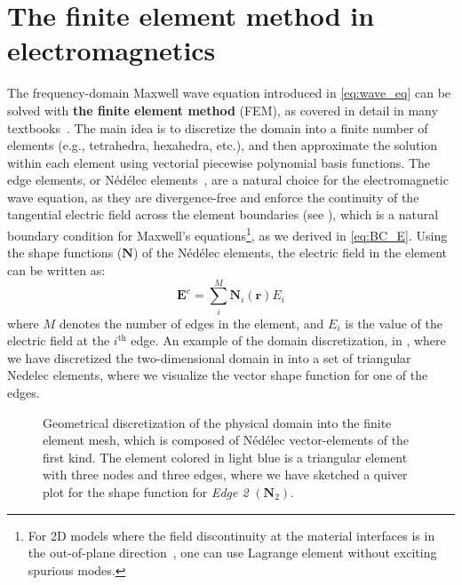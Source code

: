     \section{The finite element method in electromagnetics}\label{sec:fem}
    The frequency-domain Maxwell wave equation introduced in \eqref{eq:wave_eq} can be solved with \textbf{the finite element method} (FEM), as covered in detail 
    in many textbooks~\cite{jin, fem_book}. The main idea is to discretize the domain into a finite number of elements (e.g., tetrahedra, hexahedra, etc.), and then approximate the solution
    within each element using vectorial piecewise polynomial basis functions. The
    edge elements, or Nédélec elements~\cite{nedelec},
    are a natural choice for the electromagnetic
    wave equation, as they are divergence-free and enforce the continuity of the
    tangential electric field
    across the element boundaries (see ), which is a natural boundary condition for
    Maxwell's equations\footnote{For 2D models where the field discontinuity at the material
        interfaces
        is in the out-of-plane direction~\cite{ownpub3}, one can use Lagrange element
        without
        exciting spurious modes.}, as we derived in \eqref{eq:BC_E}. Using the shape functions ($\boldsymbol{N}$) of the Nédélec elements,
    the electric field in the element can be written as:
    \begin{equation}
        \boldsymbol{E}^e=\sum^M_i \boldsymbol{N}_i(\mathbf{r}) E_i
    \end{equation}
    where $M$ denotes the number of edges in the element, and $E_i$ is the value of the electric field at the $i^\text{th}$ edge. An example of the domain discretization,
    in ,
    where we have discretized the two-dimensional
    domain in  into a set of triangular Nedelec elements, where we visualize the vector shape function for one of the edges.

    \begin{figure}[tb]
        \centering

        \caption{Geometrical discretization of the physical domain into the finite
            element mesh, which is composed of Nédélec vector-elements of the first kind. The element colored
            in light blue is a triangular element with three nodes and three edges, where
            we have sketched a quiver plot for the shape function for \textit{Edge
            2} $(\mathbf{N}_2)$.}
        \label{fig:fem}
    \end{figure}
    

